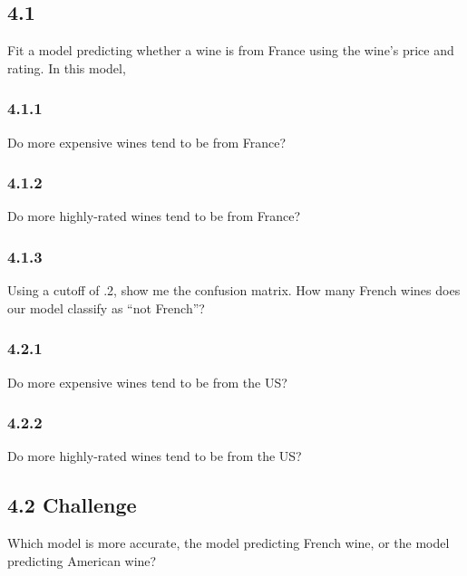 \documentclass[]{tufte-handout}
\begin{document}
\hypertarget{section-12}{%
\subsection{4.1}\label{section-12}}

Fit a model predicting whether a wine is from France using the wine's
price and rating. In this model,

\hypertarget{section-13}{%
\subsubsection{4.1.1}\label{section-13}}

Do more expensive wines tend to be from France?

\hypertarget{section-14}{%
\subsubsection{4.1.2}\label{section-14}}

Do more highly-rated wines tend to be from France?

\hypertarget{section-15}{%
\subsubsection{4.1.3}\label{section-15}}

Using a cutoff of .2, show me the confusion matrix. How many French
wines does our model classify as ``not French''?

\hypertarget{section-16}{%
\subsubsection{4.2.1}\label{section-16}}

Do more expensive wines tend to be from the US?

\hypertarget{section-17}{%
\subsubsection{4.2.2}\label{section-17}}

Do more highly-rated wines tend to be from the US?

\hypertarget{challenge-2}{%
\subsection{\texorpdfstring{4.2
\textbf{Challenge}}{4.2 Challenge}}\label{challenge-2}}

Which model is more accurate, the model predicting French wine, or the
model predicting American wine?
\end{document}
